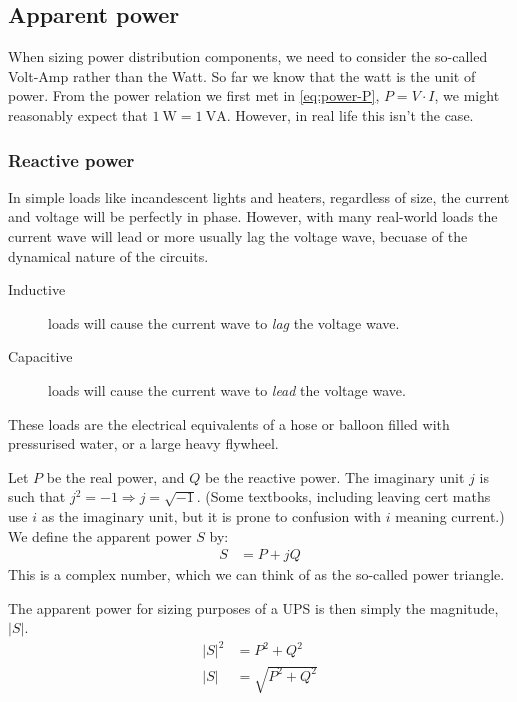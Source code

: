 \documentclass{pgnotes}
\begin{document}
\subsection{Apparent power}

When sizing power distribution components, we need to consider the so-called Volt-Amp rather than the Watt.
So far we know that the watt is the unit of power.
From the power relation we first met in \autoref{eq:power-P}, $P = V \cdot I$, we might reasonably expect that $\SI{1}{\watt}=\SI{1}{\volt\ampere}$.
However, in real life this isn't the case.

\subsubsection{Reactive power}

In simple loads like incandescent lights and heaters, regardless of size, the current and voltage will be perfectly in phase.
However, with many real-world loads the current wave will lead or more usually lag the voltage wave, becuase of the dynamical nature of the circuits.
\begin{description}
\item[Inductive] loads will cause the current wave to \textit{lag} the voltage wave.
\item[Capacitive] loads will cause the current wave to \textit{lead} the voltage wave.
\end{description}
These loads are the electrical equivalents of a hose or balloon filled with pressurised water, or a large heavy flywheel.


Let $P$ be the real power, and $Q$ be the reactive power.
The imaginary unit $j$ is such that $j^2=-1 \Rightarrow j=\sqrt{-1}$.
(Some textbooks, including leaving cert maths use $i$ as the imaginary unit, but it is prone to confusion with $i$ meaning current.)
We define the apparent power $S$ by:
\begin{align}
  S & = P + j Q
\end{align}
This is a complex number, which we can think of as the so-called power triangle.

The apparent power for sizing purposes of a UPS is then simply the magnitude, $ \left \lvert S \right \rvert $.
\begin{align}
  \left \lvert S \right \rvert ^2 & = P^2 + Q^2 \\
  \left \lvert S \right \rvert & = \sqrt{P^2+Q^2}   
\end{align}
\end{document}
